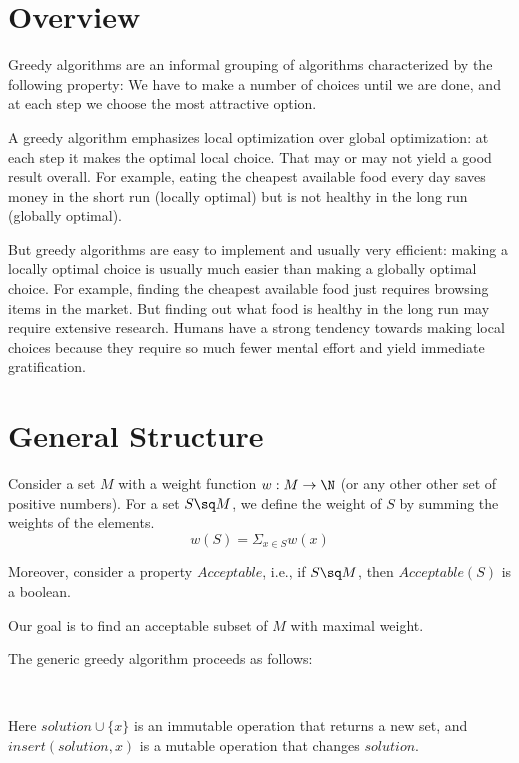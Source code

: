 \section{Overview}

Greedy algorithms are an informal grouping of algorithms characterized by the following property: We have to make a number of choices until we are done, and at each step we choose the most attractive option.

A greedy algorithm emphasizes local optimization over global optimization: at each step it makes the optimal local choice.
That may or may not yield a good result overall.
For example, eating the cheapest available food every day saves money in the short run (locally optimal) but is not healthy in the long run (globally optimal).

But greedy algorithms are easy to implement and usually very efficient: making a locally optimal choice is usually much easier than making a globally optimal choice.
For example, finding the cheapest available food just requires browsing items in the market.
But finding out what food is healthy in the long run may require extensive research.
Humans have a strong tendency towards making local choices because they require so much fewer mental effort and yield immediate gratification.

\section{General Structure}

Consider a set $M$ with a weight function $w:M\to \N$ (or any other other set of positive numbers).
For a set $S\sq M$, we define the weight of $S$ by summing the weights of the elements.
 \[w(S)=\Sigma_{x\in S} w(x)\]

Moreover, consider a property $Acceptable$, i.e., if $S\sq M$, then $Acceptable(S)$ is a boolean.

Our goal is to find an acceptable subset of $M$ with maximal weight.

The generic greedy algorithm proceeds as follows:
\begin{acode}
\\
\end{acode}
Here $solution \cup \{x\}$ is an immutable operation that returns a new set, and $insert(solution,x)$ is a mutable operation that changes $solution$.

